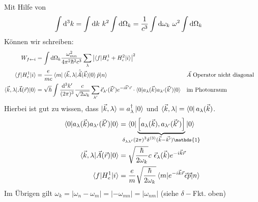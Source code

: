 		Mit Hilfe von
		\begin{align*}
		\int \mathrm{d}^3 k &= \int \mathrm{d} k ~k^2 \int \mathrm{d} \Omega_k
		= \frac{1}{c^3} \int \mathrm{d} \omega_k ~\omega^2 \int \mathrm{d} \Omega_k
		\end{align*}
		Können wir schreiben:
		\begin{align*}
		W_{f \leftarrow i} &= \int \mathrm{d} \Omega_k 
		\frac{\omega_{mn}^2}{4 \pi^2 \hbar^2 c^3}
		\sum_\lambda 
		\left|\braket{f | H_e^1 + H_e^2 | i}\right|^2 \\
		\braket{f | H_e^1 | i} &= 
		\frac{e}{mc} \braket{m | \braket{\vec{k} , \lambda | \hat{\vec{A}}(\vec{k}) | 0} \hat{p} | n} & &\vec{A}\text{~Operator nicht diagonal}\\
		\braket{\vec{k} ,\lambda | \vec{A} (\vec{r}) | 0} &= 
		\sqrt{\hbar} \int \frac{\mathrm{d}^3 k'}{(2 \pi)^3} \frac{c}{\sqrt{2 \omega_k}}
		\sum_{\lambda'} \vec{\epsilon}_{\lambda'} (\vec{k}') e^{-i \vec{k}' \vec{r}} 
		\cdot \braket{0 | a_\lambda (\vec{k}) a_{\lambda'} (\vec{k}') | 0} 
		& &\text{im Photonraum} 
		\end{align*} 
		Hierbei ist gut zu wissen, dass $\ket{\vec{k} , \lambda} = a_\lambda^\dagger \ket{0}$ und $\bra{\vec{k}, \lambda} = \bra{0}a_\lambda (\vec{k})$.
		\begin{align*}
		\braket{0 | a_\lambda (\vec{k}) a_{\lambda'} (\vec{k}') | 0} &=
		\braket{0 | 
			\underbrace{\left[ a_\lambda (\vec{k}), a_{\lambda'} (\vec{k}') \right]}_{\mathclap{\delta_{\lambda \lambda'} (2 \pi)^3 \delta^{(3)}(\vec{k} - \vec{k'}) \mathds{1}}}  
			| 0} \\
		\braket{\vec{k}, \lambda | \vec{A} (\vec{r}) | 0} &=
		\sqrt{\frac{\hbar}{2 \omega_k}} c~ \vec{\epsilon}_\lambda (\vec{k}) e^{-i \vec{k} \vec{r}} \\
		\braket{f | H_e^1 | i} &= 
		\frac{e}{m} \sqrt{\frac{\hbar}{2 \omega_k}}
		\braket{m | e^{-i \vec{k} \vec{r}} \vec{\epsilon} \vec{p} | n} 
		\end{align*}
		Im Übrigen gilt $\omega_k = |\omega_n - \omega_m| = |-\omega_{mn}| = |\omega_{nm}|$ (siehe $\delta-$Fkt. oben)
		
